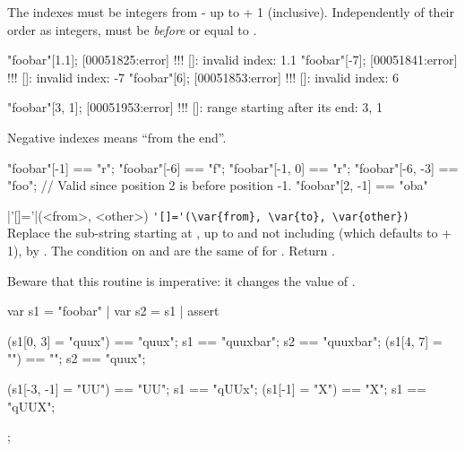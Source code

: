\begin{urbiscriptapi}
The indexes must be integers from - up to  + 1
(inclusive).  Independently of their order as integers,  must be
\emph{before} or equal to .

\begin{urbiscript}
"foobar"[1.1];
[00051825:error] !!! []: invalid index: 1.1
"foobar"[-7];
[00051841:error] !!! []: invalid index: -7
"foobar"[6];
[00051853:error] !!! []: invalid index: 6

"foobar"[3, 1];
[00051953:error] !!! []: range starting after its end: 3, 1
\end{urbiscript}

Negative indexes means ``from the end''.

\begin{urbiassert}
"foobar"[-1] == "r";
"foobar"[-6] == "f";
"foobar"[-1, 0] == "r";
"foobar"[-6, -3] == "foo";
// Valid since position 2 is before position -1.
"foobar"[2, -1] == "oba"
\end{urbiassert}

\item|'[]='|(<from>, <other>)%
  \lstinline|'[]='(\var{from}, \var{to}, \var{other})|\\
  Replace the sub-string starting at , up to and not including
   (which defaults to  + 1), by .  The condition
  on  and  are the same of for .  Return
  .

  Beware that this routine is imperative: it changes the value of
  \this.
\begin{urbiscript}
var s1 = "foobar" | var s2 = s1 |
assert
{
  (s1[0, 3] = "quux") == "quux";
  s1 == "quuxbar";
  s2 == "quuxbar";
  (s1[4, 7] = "") == "";
  s2 == "quux";

  (s1[-3, -1] = "UU") == "UU";
  s1 == "qUUx";
  (s1[-1] = "X") == "X";
  s1 == "qUUX";
};
\end{urbiscript}
\end{urbiscriptapi}

